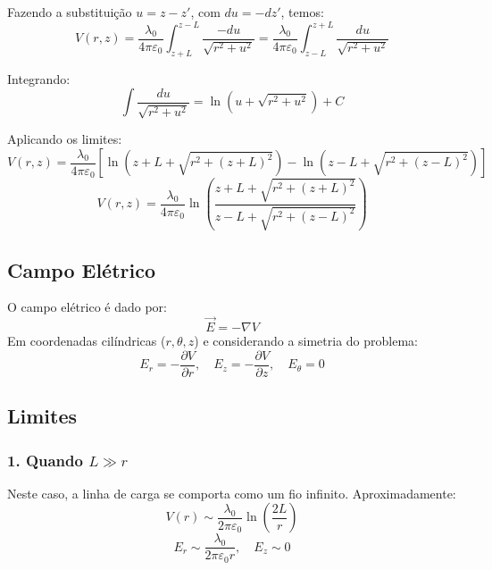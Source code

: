 \documentclass[a4paper,12pt]{article}
\begin{document}
Fazendo a substituição \( u = z - z' \), com \( du = -dz' \), temos:
\begin{equation}
V(r,z) = \frac{\lambda_0}{4\pi\varepsilon_0} \int_{z+L}^{z-L} \frac{-du}{\sqrt{r^2 + u^2}} = \frac{\lambda_0}{4\pi\varepsilon_0} \int_{z-L}^{z+L} \frac{du}{\sqrt{r^2 + u^2}}
\end{equation}

Integrando:
\begin{equation}
\int \frac{du}{\sqrt{r^2 + u^2}} = \ln\left(u + \sqrt{r^2 + u^2}\right) + C
\end{equation}

Aplicando os limites:
\begin{equation}
V(r,z) = \frac{\lambda_0}{4\pi\varepsilon_0} \left[ \ln\left(z+L + \sqrt{r^2 + (z+L)^2}\right) - \ln\left(z-L + \sqrt{r^2 + (z-L)^2}\right) \right]
\end{equation}
\begin{equation}
V(r,z) = \frac{\lambda_0}{4\pi\varepsilon_0} \ln\left( \frac{z+L + \sqrt{r^2 + (z+L)^2}}{z-L + \sqrt{r^2 + (z-L)^2}} \right)
\end{equation}

\subsection*{Campo Elétrico}

O campo elétrico é dado por:
\begin{equation}
\vec{E} = -\nabla V
\end{equation}
Em coordenadas cilíndricas (\( r, \theta, z \)) e considerando a simetria do problema:
\begin{equation}
E_r = -\frac{\partial V}{\partial r}, \quad E_z = -\frac{\partial V}{\partial z}, \quad E_\theta = 0
\end{equation}

\subsection*{Limites}

\subsubsection*{1. Quando \( L \gg r \)}

Neste caso, a linha de carga se comporta como um fio infinito. Aproximadamente:
\begin{equation}
V(r) \sim \frac{\lambda_0}{2\pi\varepsilon_0} \ln\left(\frac{2L}{r}\right)
\end{equation}
\begin{equation}
E_r \sim \frac{\lambda_0}{2\pi\varepsilon_0 r}, \quad E_z \sim 0
\end{equation}
\end{document}
